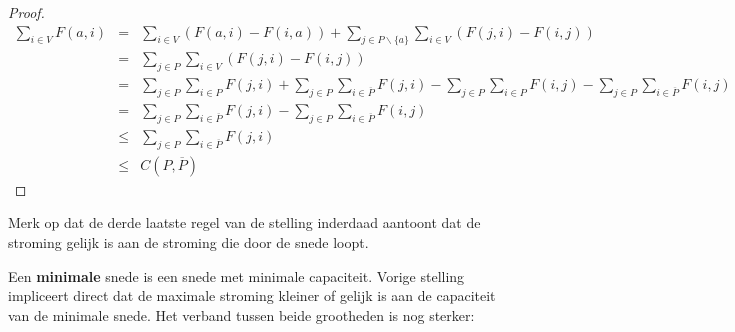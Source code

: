 
\begin{proof}
\begin{eqnarray*}
\sum_{i \in V} F(a,i) & = & 
                \sum_{i \in V}(F(a,i) - F(i,a)) +
                \sum_{j \in P \backslash \{a\}} \sum_{i \in V}(F(j,i) - F(i,j))\\
        & = & \sum_{j \in P} \sum_{i \in V} (F(j,i) - F(i,j)) \\
        & = & \sum_{j \in P} \sum_{i \in P} F(j,i) +
                \sum_{j \in P} \sum_{i \in \overline{P}} F(j,i) -
                \sum_{j \in P} \sum_{i \in P} F(i,j) -
                \sum_{j \in P} \sum_{i \in \overline{P}} F(i,j)\\
        & = & \sum_{j \in P} \sum_{i \in \overline{P}} F(j,i) -
                \sum_{j \in P} \sum_{i \in \overline{P}} F(i,j)\\
        & \leq & \sum_{j \in P} \sum_{i \in \overline{P}} F(j,i)\\
        & \leq & C(P,\overline{P})
\end{eqnarray*}
\end{proof}

Merk op dat de derde laatste regel van de stelling inderdaad aantoont
dat de stroming gelijk is aan de stroming die door de snede loopt.



Een \textbf{minimale} snede is een snede met minimale capaciteit.
Vorige stelling impliceert direct dat de maximale stroming kleiner of
gelijk is aan de capaciteit van de minimale snede. Het verband tussen
beide grootheden is nog sterker:



